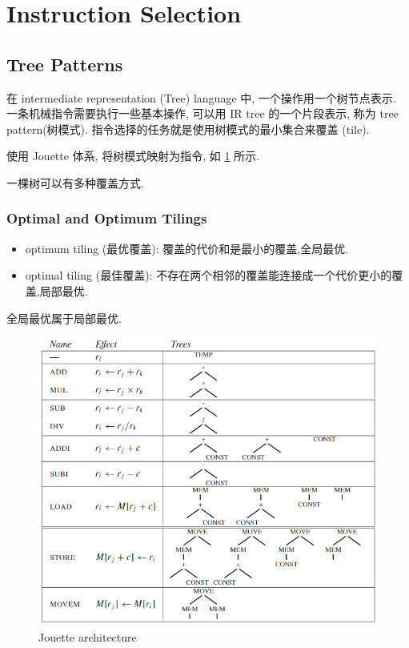 \section{Instruction Selection}

\subsection{Tree Patterns}
在 intermediate representation (Tree) language 中, 一个操作用一个树节点表示. 一条机械指令需要执行一些基本操作, 可以用 IR tree 的一个片段表示, 称为 tree pattern(树模式). 指令选择的任务就是使用树模式的最小集合来覆盖 (tile).

使用 Jouette 体系, 将树模式映射为指令, 如 \ref{fig:Jouette} 所示.

一棵树可以有多种覆盖方式. 

\subsubsection{Optimal and Optimum Tilings}
\begin{itemize}
    \item optimum tiling (最优覆盖): 覆盖的代价和是最小的覆盖,全局最优.
    \item optimal tiling (最佳覆盖): 不存在两个相邻的覆盖能连接成一个代价更小的覆盖,局部最优.
\end{itemize}
全局最优属于局部最优.

\begin{figure}[H]
    \centering
    \includegraphics[width=0.94\linewidth]{pic/CP9/Jouette architecture}
    \caption{Jouette architecture}
    \label{fig:Jouette}
\end{figure}

